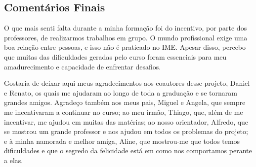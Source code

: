 \subsection{Comentários Finais}

O que mais senti falta durante a minha formação foi do incentivo, por parte dos professores, de
realizarmos trabalhos em grupo. O mundo profissional exige uma boa relação entre pessoas, e isso não
é praticado no IME. Apesar disso, percebo que muitas das dificuldades geradas pelo curso foram
essenciais para meu amadurecimento e capacidade de enfrentar desafios.

Gostaria de deixar aqui meus agradecimentos aos coautores desse projeto, Daniel e Renato, os quais
me ajudaram ao longo de toda a graduação e se tornaram grandes amigos. Agradeço também aos meus
pais, Miguel e Angela, que sempre me incentivaram a continuar no curso; ao meu irmão, Thiago, que,
além de me incentivar, me ajudou em muitas das matérias; ao nosso orientador, Alfredo, que se
mostrou um grande professor e nos ajudou em todos os problemas do projeto; e à minha namorada e
melhor amiga, Aline, que mostrou-me que todos temos dificuldades e que o segredo da felicidade está
em como nos comportamos perante a elas.